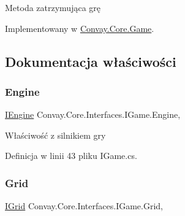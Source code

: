 Metoda zatrzymująca grę 



Implementowany w \hyperlink{class_convay_1_1_core_1_1_game_a1f0547dcd642f826756cb94f0a6f907f}{Convay.\+Core.\+Game}.



\subsection{Dokumentacja właściwości}
\hypertarget{interface_convay_1_1_core_1_1_interfaces_1_1_i_game_ac282172d44bb6148137f0d9a5d1f5dbc}{}\label{interface_convay_1_1_core_1_1_interfaces_1_1_i_game_ac282172d44bb6148137f0d9a5d1f5dbc} 
\subsubsection{\texorpdfstring{Engine}{Engine}}
{\footnotesize\ttfamily \hyperlink{interface_convay_1_1_core_1_1_interfaces_1_1_i_engine}{I\+Engine} Convay.\+Core.\+Interfaces.\+I\+Game.\+Engine\hspace{0.3cm}{\ttfamily [get]}, {\ttfamily [set]}}



Właściwość z silnikiem gry 



Definicja w linii 43 pliku I\+Game.\+cs.

\hypertarget{interface_convay_1_1_core_1_1_interfaces_1_1_i_game_ac5e7536330b91c7af27925ba34deb599}{}\label{interface_convay_1_1_core_1_1_interfaces_1_1_i_game_ac5e7536330b91c7af27925ba34deb599} 
\subsubsection{\texorpdfstring{Grid}{Grid}}
{\footnotesize\ttfamily \hyperlink{interface_convay_1_1_core_1_1_interfaces_1_1_i_grid}{I\+Grid} Convay.\+Core.\+Interfaces.\+I\+Game.\+Grid\hspace{0.3cm}{\ttfamily [get]}, {\ttfamily [set]}}



